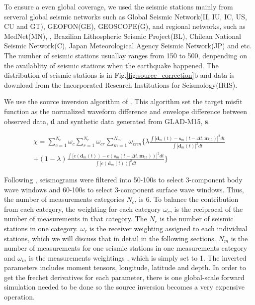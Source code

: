 \documentclass[extra,mreferee]{gji}
\begin{document}
To ensure a even global coverage, we used the seismic stations mainly from serveral global
seismic networks such as Global Seismic Network(II, IU, IC, US, CU and GT),
GEOFON(GE), GEOSCOPE(G), and regional networks, such as MedNet(MN),
, Brazilian Lithospheric Seismic Project(BL), Chilean National Seismic Network(C), Japan Meteorological
Agency Seismic Network(JP) and etc. The number of seismic stations usuallay ranges
from 150 to 500, denpending on the availablity of seismic stations when the earthquake
happened. The distribution of seismic stations is in Fig.\ref{fig:source_correction}b and
data is download from the Incorporated Research Institutions for Seismology(IRIS).

We use the source inversion algorithm of \cite{liu2004spectral}. This algorithm set the
target misfit function as the normalized waveform difference and envelope difference between
observed data, \textbf{d} and synthetic data generated from GLAD-M15, \textbf{s}.

\begin{multline}
  \chi = \sum\limits_{c=1}^{N_c} \omega_c \sum\limits_{r=1}^{N_r} \omega_{cr}
       \sum\limits_{m=1}^{N_m} \omega_{crm}
       \Big\{ \lambda {\frac
              { \int \big[ \mathbf{d}_m(t) - \mathbf{s}_m(t - \Delta t, \mathbf{m}_{15}) \big]^2 dt }
              {\int \big[ \mathbf{d}_m(t) \big]^2  dt } }\\
         + (1 - \lambda) \frac
              {\int \big[ e(\mathbf{d}_m(t)) - e(\mathbf{s}_m(t - \Delta t, \mathbf{m}_{15})) \big]^2 dt }
              {\int \big[ e(\mathbf{d}_m(t)) \big]^2  dt} \Big\}
\end{multline}

Following \cite{ekstrom2012global}, seismograms were filtered into 50-100s
to select 3-component body wave windows and 60-100s to select 3-component
surface wave windows. Thus, the number of measurements categories $N_c$,
is 6. To balance the contribution from each category, the weighting for each
category $\omega_c$, is the reciprocal of the number of measurements in that
category. The $N_r$ is the number of seismic stations in one category. $\omega_r$
is the receiver weighting assigned to each individual stations, which we will discuss
that in detail in the following sections. $N_m$ is the number of measurements for one
seismic stations in one measurements category and $\omega_m$ is the measurements weightings
, which is simply set to 1. The inverted parameters includes moment tensors, longitude,
latitude and depth. In order to get the frechet derivatives for each parameter, there is
one global-scale forward simulation needed to be done so the source inversion becomes a very expensive
operation.
\end{document}
